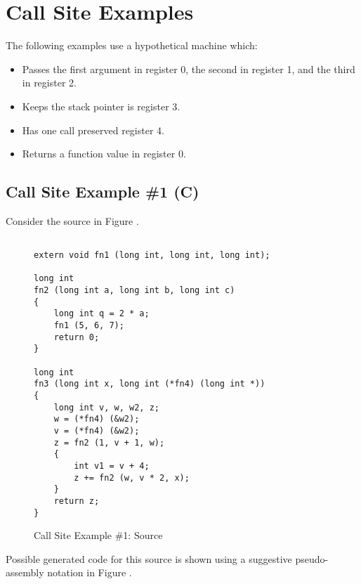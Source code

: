 \clearpage
\section{Call Site Examples}
\label{app:callsiteexamples}
The following examples use a hypothetical machine which: 
\begin{itemize}
\item
Passes the first argument in register 0, the second in register 1, and the third in register 2.
\item
Keeps the stack pointer is register 3.
\item
Has one call preserved register 4.
\item
Returns a function value in register 0.
\end{itemize}

\subsection{Call Site Example \#1 (C)}
Consider the  source in Figure .

\begin{figure}[ht]
\begin{lstlisting}

extern void fn1 (long int, long int, long int);

long int
fn2 (long int a, long int b, long int c) 
{
    long int q = 2 * a;
    fn1 (5, 6, 7); 
    return 0;
}
 
long int
fn3 (long int x, long int (*fn4) (long int *))
{
    long int v, w, w2, z;
    w = (*fn4) (&w2);
    v = (*fn4) (&w2);
    z = fn2 (1, v + 1, w);
    {
        int v1 = v + 4;
        z += fn2 (w, v * 2, x);
    }
    return z;
}
\end{lstlisting}
\caption{Call Site Example \#1: Source}
\label{fig:callsiteexample1source}
\end{figure}

Possible generated code for this source is shown using a suggestive 
pseudo-\linebreak[0]assembly notation in Figure .

